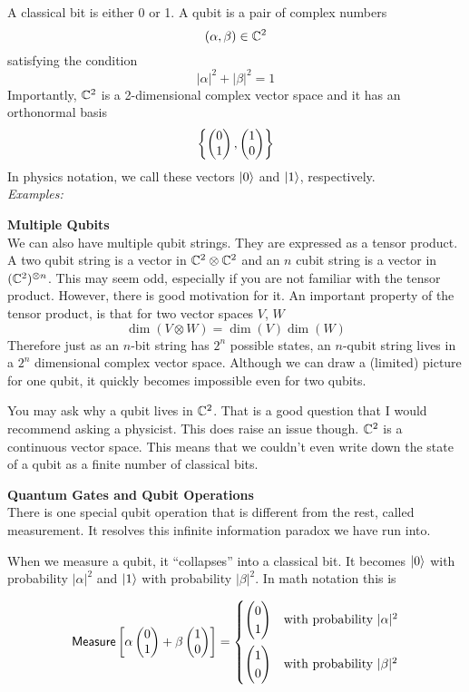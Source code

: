 \documentclass[12pt,twoside]{reedthesis}
\theoremstyle{definition}\newtheorem{definition}{Definition}
\begin{document}
    A classical bit is either 0 or 1. A qubit is a pair of complex numbers 
    \[
        (\alpha, \beta) \in \mathbb{C}^2 
    \]
    satisfying the condition
    \[
        |\alpha|^2 + |\beta|^2 = 1
    \]
    Importantly, $\mathbb{C}^2$ is a 2-dimensional complex vector space and it has an orthonormal basis   \[
        \left\{\begin{pmatrix} 0 \\ 1 \end{pmatrix}, \begin{pmatrix} 1 \\ 0 \end{pmatrix}\right\}
    \]
    In physics notation, we call these vectors $\ket{0}$ and $\ket{1}$, respectively.\\ 

    \textit{Examples:}

    \textbf{Multiple Qubits}\\ 
    We can also have multiple qubit strings. They are expressed as a tensor product. A two qubit string is a vector in $\mathbb{C}^2 \otimes \mathbb{C}^2$ and an $n$ cubit string is a vector in $(\mathbb{C}^2)^{\otimes n}$. This may seem odd, especially if you are not familiar with the tensor product. However, there is good motivation for it. An important property of the tensor product, is that for two vector spaces $V$, $W$
    \[
        \dim (V \otimes W ) = \dim(V)\dim(W)
    \]
    Therefore just as an $n$-bit string has $2^n$ possible states, an $n$-qubit string lives in a $2^n$ dimensional complex vector space. Although we can draw a (limited) picture for one qubit, it quickly becomes impossible even for two qubits.

    You may ask why a qubit lives in $\mathbb{C}^2$. That is a good question that I would recommend asking a physicist. 
    This does raise an issue though. $\mathbb{C}^2$ is a continuous vector space. This means that we couldn't even write down the state of a qubit as a finite number of classical bits. 


    \textbf{Quantum Gates and Qubit Operations} \\
    There is one special qubit operation that is different from the rest, called measurement. It resolves this infinite information paradox we have run into.

    When we measure a qubit, it ``collapses'' into a classical bit. It becomes $\ket{0}$ with probability $|\alpha|^2$ and $\ket{1}$ with probability $|\beta|^2$. In math notation this is

    \[
        \textsf{Measure}\left[\alpha\cvec{0}{1} + \beta\cvec{1}{0}\right] = 
        \begin{cases}
            \cvec{0}{1} &\text{with probability } |\alpha|^2 \vspace{5px}\\
            \cvec{1}{0} &\text{with probability } |\beta|^2
        \end{cases}
    \]
\end{document}
